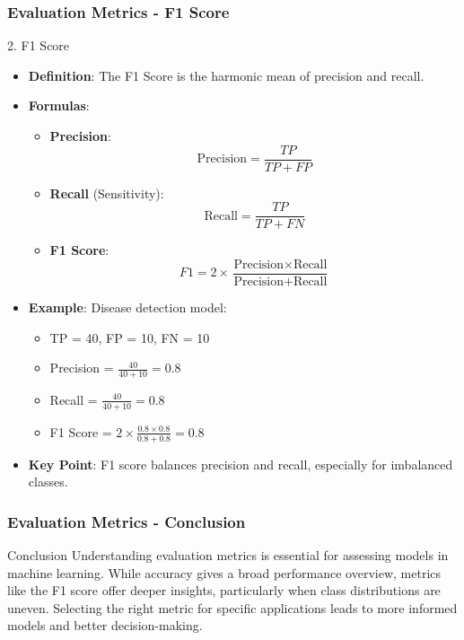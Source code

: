 \documentclass[aspectratio=169]{beamer}
\begin{document}
\begin{frame}[fragile]
    \frametitle{Evaluation Metrics - F1 Score}
    \begin{block}{2. F1 Score}
        \begin{itemize}
            \item \textbf{Definition}: The F1 Score is the harmonic mean of precision and recall.
            \item \textbf{Formulas}:
            \begin{itemize}
                \item \textbf{Precision}:
                \begin{equation}
                \text{Precision} = \frac{TP}{TP + FP}
                \end{equation}
                \item \textbf{Recall} (Sensitivity):
                \begin{equation}
                \text{Recall} = \frac{TP}{TP + FN}
                \end{equation}
                \item \textbf{F1 Score}:
                \begin{equation}
                F1 = 2 \times \frac{\text{Precision} \times \text{Recall}}{\text{Precision} + \text{Recall}}
                \end{equation}
            \end{itemize}
            \item \textbf{Example}: Disease detection model:
            \begin{itemize}
                \item TP = 40, FP = 10, FN = 10
                \item Precision = \( \frac{40}{40 + 10} = 0.8 \)
                \item Recall = \( \frac{40}{40 + 10} = 0.8 \)
                \item F1 Score = \( 2 \times \frac{0.8 \times 0.8}{0.8 + 0.8} = 0.8 \)
            \end{itemize}
            \item \textbf{Key Point}: F1 score balances precision and recall, especially for imbalanced classes.
        \end{itemize}
    \end{block}
\end{frame}

\begin{frame}[fragile]
    \frametitle{Evaluation Metrics - Conclusion}
    \begin{block}{Conclusion}
        Understanding evaluation metrics is essential for assessing models in machine learning. 
        While accuracy gives a broad performance overview, metrics like the F1 score offer deeper insights, particularly when class distributions are uneven. 
        Selecting the right metric for specific applications leads to more informed models and better decision-making.
    \end{block}
\end{frame}
\end{document}
